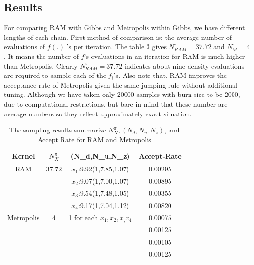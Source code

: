 \documentclass{article}
\begin{document}
\subsection*{Results}
For comparing RAM with Gibbs and Metropolis within Gibbs, we have different lengths of each chain. First method of comparison is: the average number of evaluations of $f(.)$ ’s per iteration. The table 3 gives $N_{RAM}^{\pi}=37.72$ and $N_{M}^{\pi}=4$. It means the number of $f$'s evaluations in an iteration for RAM is much higher than Metropolis. Clearly $N_{RAM}^{\pi}=37.72$ indicates about nine density evaluations are required to sample each of the $f_i$’s. Also note that, RAM improves the acceptance rate of
Metropolis given the same jumping rule
without additional tuning. Although we have taken only 20000 samples with burn size to be 2000, due to computational restrictions, but bare in mind that these number are average numbers so they reflect approximately exact situation.
\begin{table}[H]
\caption{ The sampling results summarize $N_X^{\pi},(N_d,N_u,N_z)$, and Accept Rate for RAM and Metropolis} %
\centering %
\begin{tabular}{c c c c } %
\hline\hline %
Kernel & $N_X^{\pi}$ & (N_d,N_u,N_z) &Accept-Rate  \\ [0.5ex] %
\hline %
RAM & 37.72 & $x_1$:9.92(1,7.85,1.07) & 0.00295\\
 &  & $x_2$:9.07(1,7.00,1.07) & 0.00895\\
  &  & $x_3$:9.54(1,7.48,1.05) & 0.00355\\
   &  & $x_4$:9.17(1,7.04,1.12) & 0.00820\\%
Metropolis & 4 & 1 for each $x_1,x_2,x_,x_4$ &0.00075\\
 &  &  & 0.00125\\
  &  &  & 0.00105\\
   &  &  & 0.00125\\[1ex] 
\hline %
\end{tabular}
\label{table:nonlin} %
\end{table}
\end{document}
